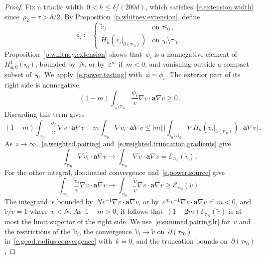\documentclass[11pt,letterpaper]{article}
\numberwithin{equation}{section}
\theoremstyle{definition}
\renewcommand{\a}{\mathbf{a}}
\newcommand{\eps}{\varepsilon}
\newcommand{\cu}{\square}
\newcommand{\Ener}{\mathcal E}
\newcommand{\Hzero}[1]{H^1_{#1,0}}
\begin{document}
\begin{proof}
Fix a triadic width~$0<h\leq\delta/(200d)$, which satisfies~\eqref{e.extension.width} since~$\rho_2-\tau>\delta/2$. By Proposition~\ref{p.whitney.extension}, define
\begin{equation*}
	\phi_i\coloneqq\begin{cases}
		\tilde v_i&\text{on }\tau\overline{\cu}_0\,,\\
		H_h(\tilde v_i|_{\partial(\tau\cu_0)})&\text{on }\cu_0\setminus\tau\overline{\cu}_0\,.
	\end{cases}
\end{equation*}
Proposition~\ref{p.whitney.extension} shows that~$\phi_i$ is a nonnegative element of~$\Hzero{\a}(\cu_0)$, bounded by~$N$, or by~$\eps^m$ if~$m<0$, and vanishing outside a compact subset of~$\cu_0$. We apply~\eqref{e.power.testing} with~$\phi=\phi_i$. The exterior part of its right side is nonnegative,
\begin{equation*}
	(1-m)\int_{\cu_0\setminus\tau\overline{\cu}_0}\frac{\phi_i}{v}\nabla v\cdot\a\nabla v\geq0\,.
\end{equation*}
Discarding this term gives
\begin{equation*}
	(1-m)\int_{\tau\cu_0}\frac{\tilde v_i}v\,\nabla v\cdot\a\nabla v-m\int_{\tau\cu_0}\nabla\tilde v_i\cdot\a\nabla v\leq|m|\,\biggl|\int_{\cu_0\setminus\tau\overline{\cu}_0}\nabla H_h(\tilde v_i|_{\partial(\tau\cu_0)})\cdot\a\nabla v\biggr|\,.
\end{equation*}
As~$i\to\infty$,~\eqref{e.weighted.pairing} and~\eqref{e.weighted.truncation.gradients} give
\begin{equation*}
	\int_{\tau\cu_0}\nabla\tilde v_i\cdot\a\nabla v\longrightarrow\int_{\tau\cu_0}\nabla\tilde v\cdot\a\nabla v=\Ener_{\tau\cu_0}(\tilde v)\,.
\end{equation*}
For the other integral, dominated convergence and~\eqref{e.power.source} give
\begin{equation*}
	\int_{\tau\cu_0}\frac{\tilde v_i}{v}\nabla v\cdot\a\nabla v\longrightarrow\int_{\tau\cu_0}\frac{\tilde v}{v}\nabla v\cdot\a\nabla v\geq\Ener_{\tau\cu_0}(\tilde v)\,.
\end{equation*}
The integrand is bounded by~$Nv^{-1}\nabla v\cdot\a\nabla v$, or by~$\eps^mv^{-1}\nabla v\cdot\a\nabla v$ if~$m<0$, and~$\tilde v/v=1$ where~$v<N$. As~$1-m>0$, it follows that~$(1-2m)\Ener_{\tau\cu_0}(\tilde v)$ is at most the limit superior of the right side. We use~\eqref{e.summed.pairing.lr} for~$v$ and the restrictions of the~$\tilde v_i$, the convergence~$\tilde v_i\to\tilde v$ on~$\partial(\tau\cu_0)$ in~\eqref{e.good.radius.convergence} with~$k=0$, and the truncation bounds on~$\partial(\tau\cu_0)$,

\end{proof}
\end{document}
